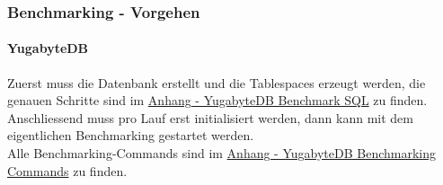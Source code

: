 
\begin{flushleft}
    \subsubsection{Benchmarking - Vorgehen}
    \paragraph{YugabyteDB}
    Zuerst muss die Datenbank erstellt und die Tablespaces erzeugt werden, die genauen Schritte sind im \hyperref[subsubsec:yugabytedb_benchmarking_sql]{Anhang - YugabyteDB Benchmark SQL} zu finden.\\
    Anschliessend muss pro Lauf erst initialisiert werden, dann kann mit dem eigentlichen Benchmarking gestartet werden.\\
    Alle Benchmarking-Commands sind im \hyperref[subsec:yugabytedb_benchmarking_commands]{Anhang - YugabyteDB Benchmarking Commands} zu finden.

\end{flushleft}
